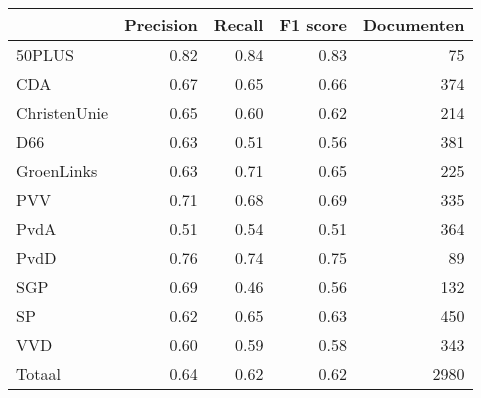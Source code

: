 \begin{tabular}{lrrrr}
\toprule
{} &  Precision &  Recall &  F1 score &  Documenten \\
\midrule
50PLUS       &       0.82 &    0.84 &      0.83 &          75 \\
CDA          &       0.67 &    0.65 &      0.66 &         374 \\
ChristenUnie &       0.65 &    0.60 &      0.62 &         214 \\
D66          &       0.63 &    0.51 &      0.56 &         381 \\
GroenLinks   &       0.63 &    0.71 &      0.65 &         225 \\
PVV          &       0.71 &    0.68 &      0.69 &         335 \\
PvdA         &       0.51 &    0.54 &      0.51 &         364 \\
PvdD         &       0.76 &    0.74 &      0.75 &          89 \\
SGP          &       0.69 &    0.46 &      0.56 &         132 \\
SP           &       0.62 &    0.65 &      0.63 &         450 \\
VVD          &       0.60 &    0.59 &      0.58 &         343 \\
Totaal       &       0.64 &    0.62 &      0.62 &        2980 \\
\bottomrule
\end{tabular}
